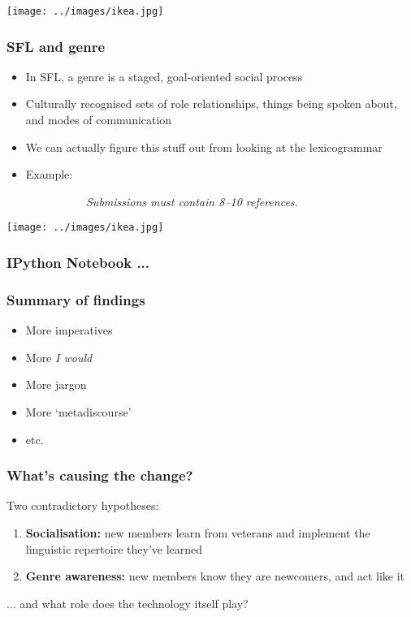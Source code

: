 \documentclass{beamer}       %
\begin{document}
  \begin{frame}
    \centering
    \texttt{[image: ../images/ikea.jpg]}
  \end{frame}


\begin{frame}
\frametitle{SFL and genre}
\begin{itemize}
	\item In SFL, a genre is a staged, goal-oriented social process
	\item Culturally recognised sets of role relationships, things being spoken about, and modes of communication
	\item We can actually figure this stuff out from looking at the lexicogrammar
	\item Example: 
	\end{itemize}
	~~~~~~~~~~~~~~\emph{Submissions must contain 8--10 references.}
\end{frame}

  \begin{frame}
    \centering
    \texttt{[image: ../images/ikea.jpg]}
  \end{frame}

\begin{frame}
	\frametitle{IPython Notebook ...}
	
\end{frame}


\begin{frame}
	\frametitle{Summary of findings}
	
	\begin{itemize}
	\item More imperatives
	\item More \emph{I would}
	\item More jargon
	\item More `metadiscourse'
	\item etc.
	\end{itemize}
\end{frame}


\begin{frame}
	\frametitle{What's causing the change?}
	
	Two contradictory hypotheses:

	\begin{enumerate}
	\item \textbf{Socialisation:} new members learn from veterans and implement the linguistic repertoire they've learned
	\item \textbf{Genre awareness:} new members know they are newcomers, and act like it
	\end{enumerate}
	... and what role does the technology itself play? 
\end{frame}
\end{document}
